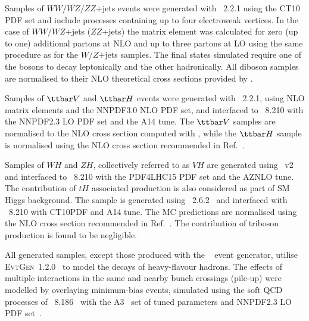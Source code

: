 \documentclass[PAPER, coverpage, atlasdraft=true, texlive=2016, UKenglish]{\ATLASLATEXPATH atlasdoc} %
\begin{document}
Samples of $WW/WZ/ZZ$+jets events were generated with {\sherpa}~2.2.1 using the CT10 PDF set
and include processes containing up to four electroweak vertices. 
In the case of $WW/WZ$+jets ($ZZ$+jets) the matrix element was calculated for zero (up to one) additional partons 
at NLO and up to three partons at LO using the same procedure as for the $W/Z$+jets samples. 
The final states simulated require one of the bosons to decay leptonically and the other hadronically.
All diboson samples are normalised to their NLO theoretical cross sections provided by {\sherpa}. 

Samples of $\ttbar V$ and $\ttbar H$ events were generated with {\amcatnlo}~2.2.1, using NLO matrix elements and the NNPDF3.0 NLO PDF set,
and interfaced to {\pythia}~8.210 with the NNPDF2.3 LO PDF set and the A14 tune. 
The $\ttbar V$ samples are normalised to the NLO cross section computed with {\amcatnlo}, while the $\ttbar H$ sample is normalised using 
the NLO cross section recommended in Ref.~\cite{deFlorian:2016spz}.

Samples of $WH$ and $ZH$, collectively referred to as $VH$ are generated using {\powheg}~v2 \cite{Frixione:2007nw,Nason:2004rx,Frixione:2007vw,Alioli:2010xd}
and interfaced to {\pythia}~8.210 with the PDF4LHC15 PDF set and the AZNLO tune.
The contribution of $tH$ associated production is also considered as part of SM Higgs background.
The sample is generated using {\amcatnlolong}~2.6.2~\cite{Alwall:2014hca} and interfaced with {\pythia}~8.210 with CT10PDF
and A14 tune. The MC predictions are normalised using the NLO cross section recommended in Ref.~\cite{deFlorian:2016spz}.
The contribution of triboson production is found to be negligible.

All generated samples, except those produced with the {\sherpa}~\cite{Gleisberg:2008ta} event generator, 
utilise \textsc{EvtGen}~1.2.0~\cite{Lange:2001uf} to model the decays of heavy-flavour hadrons. 
The effects of multiple interactions in the same and nearby bunch crossings (pile-up) were modelled by overlaying minimum-bias events, simulated using the soft QCD processes of {\pythia}~8.186~\cite{Sjostrand:2006za} with the A3~\cite{ATL-PHYS-PUB-2016-017} set of tuned parameters and NNPDF2.3 LO PDF set~\cite{Ball:2012cx}.
\end{document}
